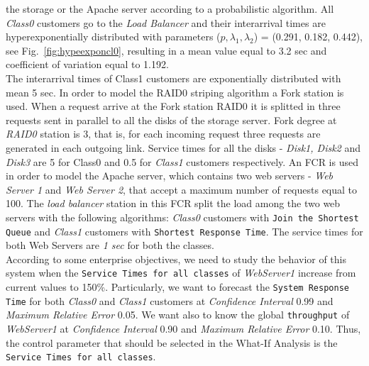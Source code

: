 the storage or the Apache server according to a probabilistic
algorithm. All \emph{Class0} customers go to the \emph{Load
Balancer} and their interarrival times are hyperexponentially
distributed with parameters ($p, \lambda_1, \lambda_2$) = (0.291,
0.182, 0.442), see Fig.~\ref{fig:hypeexponcl0}, resulting in a
mean value equal
to 3.2 sec and coefficient of variation equal to 1.192.\\
The interarrival times of Class1 customers are exponentially
distributed with mean 5 sec. In order to model the RAID0 striping
algorithm a Fork station is used. When a request arrive at the
Fork station RAID0 it is splitted in three requests sent in
parallel to all the disks of the storage server. Fork degree at
\emph{RAID0} station is 3, that is, for each incoming request
three requests are generated in each outgoing link. Service times
for all the disks - \emph{Disk1, Disk2} and \emph{Disk3} are 5 for
Class0 and 0.5 for \emph{Class1} customers respectively. An FCR is
used in order to model the Apache server, which contains two web
servers - \emph{Web Server 1} and \emph{Web Server 2}, that accept
a maximum number of requests equal to 100. The \emph{load
balancer} station in this FCR split the load among the two web
servers with the following algorithms: \emph{Class0} customers
with \texttt{Join the Shortest Queue} and \emph{Class1} customers
with \texttt{Shortest Response Time}. The service times for both
Web Servers are \emph{1 sec} for both the
classes.\\
According to some enterprise  objectives, we need to study the
behavior of this system when the \texttt{Service Times for all
classes} of \emph{WebServer1} increase from current values to
150\%. Particularly, we want to forecast the \texttt{System
Response Time} for both \emph{Class0} and \emph{Class1} customers
at \emph{Confidence Interval} 0.99 and \emph{Maximum Relative
Error} 0.05. We want also to know the global \texttt{throughput}
of \emph{WebServer1} at \emph{Confidence Interval} 0.90 and
\emph{Maximum Relative Error} 0.10. Thus, the control parameter
that should be selected in the What-If Analysis is the
\texttt{Service Times for all classes}.\\

